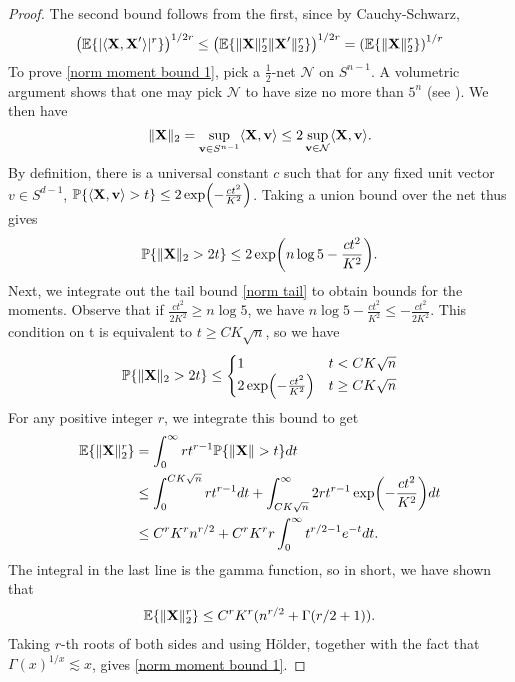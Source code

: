 \documentclass[final,12pt]{colt2018} %
\numberwithin{equation}{section}
\DeclarePairedDelimiter{\abs}{\lvert}{\rvert}
\DeclarePairedDelimiter{\norm}{\lVert}{\rVert}
\DeclarePairedDelimiter{\paren}{(}{)}
\DeclarePairedDelimiter{\braces}{\lbrace}{\rbrace}
\DeclarePairedDelimiter{\inprod}{\langle}{\rangle}
\renewcommand{\P}{\mathbb{P}}
\newcommand{\E}{\mathbb{E}}
\newcommand{\boldv}{\textbf{v}}
\newcommand{\boldX}{\textbf{X}}
\begin{document}
\begin{proof}
	The second bound follows from the first, since by Cauchy-Schwarz,
	\[
	\paren*{\E\braces{\abs{\inprod{\boldX,\boldX'}}^r}}^{1/{2r}} \leq \paren*{\E\braces{\norm{\boldX}_2^r\norm{\boldX'}_2^r}}^{1/2r} = \paren*{\E\braces{\norm{\boldX}_2^r}}^{1/r}
	\]
	To prove \eqref{norm moment bound 1}, pick a $\frac{1}{2}$-net $\mathcal{N}$ on $S^{n-1}$. A volumetric argument shows that one may pick $\mathcal{N}$ to have size no more than $5^n$ (see \cite{Vershynin2011b}). We then have
	\[
	\norm{\boldX}_2 = \sup_{\boldv \in S^{n-1}}\inprod{\boldX,\boldv} \leq 2\sup_{\boldv \in \mathcal{N}}\inprod{\boldX,\boldv}.
	\]
	By definition, there is a universal constant $c$ such that for any fixed unit vector $v \in S^{d-1}$, $\P\braces{ \inprod{\boldX,\boldv} > t } \leq 2\exp\paren*{-\frac{ct^2}{K^2}}$. Taking a union bound over the net thus gives
	\begin{align} \label{norm tail}
	\P\braces*{\norm{\boldX}_2 > 2t} \leq 2\exp\paren*{n\log5 - \frac{ct^2}{K^2}}.
	\end{align}
	Next, we integrate out the tail bound \eqref{norm tail} to obtain bounds for the moments. Observe that if $\frac{ct^2}{2K^2} \geq n\log 5$, we have $n\log 5 - \frac{ct^2}{K^2} \leq - \frac{ct^2}{2K^2}$. This condition on t is equivalent to $t \geq CK\sqrt{n}$, so we have
	\begin{align} \label{norm tail bound}
	\P\braces*{\norm{\boldX}_2 > 2t} \leq
	\begin{cases}
	1 & t < CK\sqrt{n} \\
	2\exp\paren*{-\frac{ct^2}{K^2}} & t \geq CK\sqrt{n}
	\end{cases}
	\end{align}
	For any positive integer $r$, we integrate this bound to get
	\begin{align*}
	\E\braces{\norm{\boldX}_2^r} & = \int_0^\infty rt^{r-1}\P\braces*{\norm{\boldX} > t}dt \\
	& \leq \int_0^{CK\sqrt{n}} rt^{r-1} dt + \int_{CK\sqrt{n}}^\infty 2rt^{r-1}\exp\paren*{-\frac{ct^2}{K^2}}dt \\
	& \leq C^rK^rn^{r/2} + C^rK^rr\int_0^\infty t^{r/2-1}e^{-t}dt.
	\end{align*}
	The integral in the last line is the gamma function, so in short, we have shown that
	\begin{align} \label{alternate norm moment bound}
	\E\braces{\norm{\boldX}_2^r} \leq C^rK^r\paren{n^{r/2}+\Gamma(r/2+1)}.
	\end{align}
	Taking $r$-th roots of both sides and using H{\"o}lder, together with the fact that $\Gamma(x)^{1/x} \lesssim x$, gives \eqref{norm moment bound 1}.
\end{proof}
\end{document}
